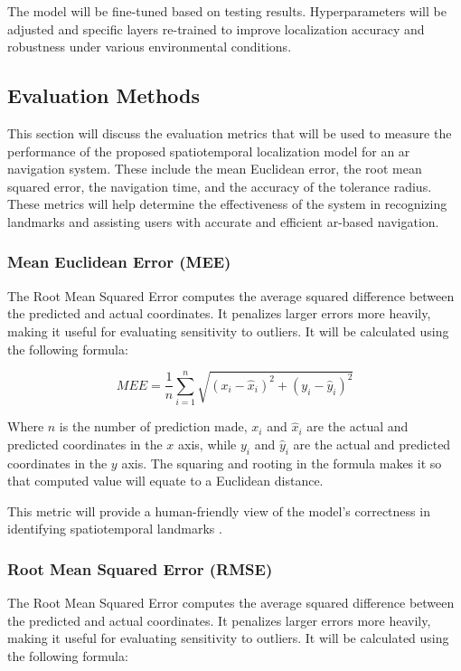 \begin{refsection}
The model will be fine-tuned based on testing results. Hyperparameters will be adjusted and specific layers re-trained to improve localization accuracy and robustness under various environmental conditions.

\subsection{Evaluation Methods}

This section will discuss the evaluation metrics that will be used to measure the performance of the proposed spatiotemporal localization model for an \gls{ar} navigation system. These include the mean Euclidean error, the root mean squared error, the navigation time, and the accuracy of the tolerance radius. These metrics will help determine the effectiveness of the system in recognizing landmarks and assisting users with accurate and efficient \gls{ar}-based navigation.

\subsubsection{Mean Euclidean Error (MEE)}

The Root Mean Squared Error computes the average squared difference between the predicted and actual coordinates. It penalizes larger errors more heavily, making it useful for evaluating sensitivity to outliers. It will be calculated using the following formula:

\begin{equation}
MEE = \frac{1}{n} \sum_{i=1}^{n} \sqrt{(x_i - \hat{x}_i)^2 + (y_i - \hat{y}_i)^2}
\label{eq:mee}
\end{equation}

Where \(n\) is the number of prediction made, \(x_i\) and \(\hat{x}_i\) are the actual and predicted coordinates in the \(x\) axis, while \(y_i\) and \(\hat{y}_i\) are the actual and predicted coordinates in the \(y\) axis. The squaring and rooting in the formula makes it so that computed value will equate to a Euclidean distance.

This metric will provide a human-friendly view of the model's correctness in identifying spatiotemporal landmarks \cite{gmd-15-5481-2022}.

\subsubsection{Root Mean Squared Error (RMSE)}

The Root Mean Squared Error computes the average squared difference between the predicted and actual coordinates. It penalizes larger errors more heavily, making it useful for evaluating sensitivity to outliers. It will be calculated using the following formula:


\end{refsection}
